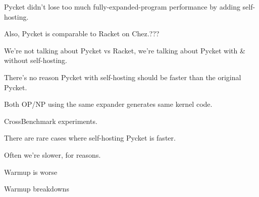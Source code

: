 		\begin{mainpoint}
				Pycket didn't lose too much fully-expanded-program performance by adding self-hosting.

				Also, Pycket is comparable to Racket on Chez.???
		\end{mainpoint}

		\begin{paragraph-here}
			We're not talking about Pycket vs Racket, we're talking about Pycket with \& without self-hosting.
		\end{paragraph-here}

		\begin{paragraph-here}
			There’s no reason Pycket with self-hosting should be faster than the original Pycket.

			Both OP/NP using the same expander generates same kernel code.
		\end{paragraph-here}

		\begin{show-experiment}
			CrossBenchmark experiments.
		\end{show-experiment}

		\begin{paragraph-here}
			There are rare cases where self-hosting Pycket is faster.
		\end{paragraph-here}

		\begin{paragraph-here}
			 Often we're slower, for reasons.
		\end{paragraph-here}

		\begin{paragraph-here}
			Warmup is worse
		\end{paragraph-here}

		\begin{show-experiment}
			Warmup breakdowns
		\end{show-experiment}






